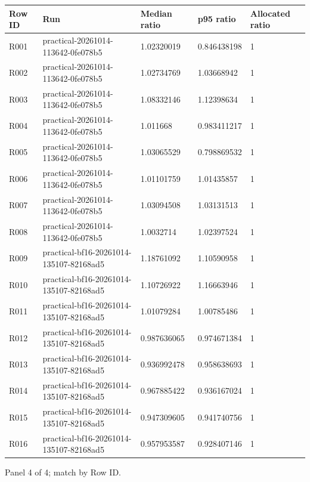 \documentclass[10pt]{article}
\begin{document}
{\scriptsize\setlength{\tabcolsep}{2pt}
\begin{longtable}{p{}p{}p{}p{}p{}}
Row ID & Run & Median ratio & p95 ratio & Allocated ratio \\
\hline\endhead
R001 & practical-20261014-113642-0fe078b5 & 1.02320019 & 0.846438198 & 1 \\
R002 & practical-20261014-113642-0fe078b5 & 1.02734769 & 1.03668942 & 1 \\
R003 & practical-20261014-113642-0fe078b5 & 1.08332146 & 1.12398634 & 1 \\
R004 & practical-20261014-113642-0fe078b5 & 1.011668 & 0.983411217 & 1 \\
R005 & practical-20261014-113642-0fe078b5 & 1.03065529 & 0.798869532 & 1 \\
R006 & practical-20261014-113642-0fe078b5 & 1.01101759 & 1.01435857 & 1 \\
R007 & practical-20261014-113642-0fe078b5 & 1.03094508 & 1.03131513 & 1 \\
R008 & practical-20261014-113642-0fe078b5 & 1.0032714 & 1.02397524 & 1 \\
R009 & practical-bf16-20261014-135107-82168ad5 & 1.18761092 & 1.10590958 & 1 \\
R010 & practical-bf16-20261014-135107-82168ad5 & 1.10726922 & 1.16663946 & 1 \\
R011 & practical-bf16-20261014-135107-82168ad5 & 1.01079284 & 1.00785486 & 1 \\
R012 & practical-bf16-20261014-135107-82168ad5 & 0.987636065 & 0.974671384 & 1 \\
R013 & practical-bf16-20261014-135107-82168ad5 & 0.936992478 & 0.958638693 & 1 \\
R014 & practical-bf16-20261014-135107-82168ad5 & 0.967885422 & 0.936167024 & 1 \\
R015 & practical-bf16-20261014-135107-82168ad5 & 0.947309605 & 0.941740756 & 1 \\
R016 & practical-bf16-20261014-135107-82168ad5 & 0.957953587 & 0.928407146 & 1 \\
\end{longtable}}
\par\noindent Panel 4 of 4; match by Row ID.
\end{document}
